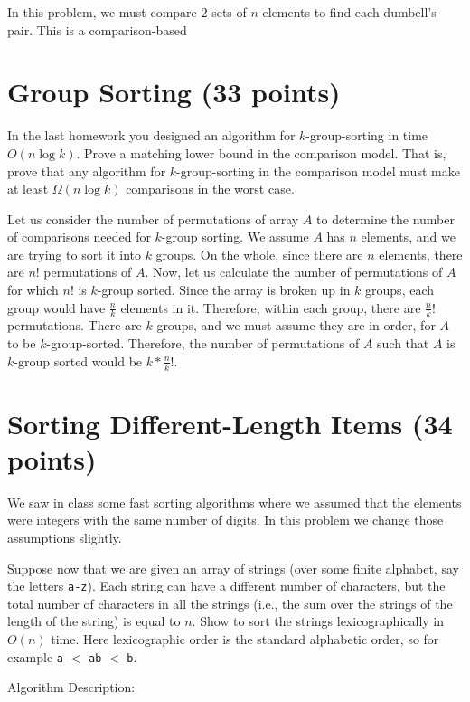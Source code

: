 \documentclass[11pt]{article}
\begin{document}
\bigbreak

In this problem, we must compare $2$ sets of $n$ elements to find each dumbell's pair. 
This is a comparison-based 

\section{Group Sorting (33 points)}
In the last homework you designed an algorithm for $k$-group-sorting in time $O(n \log k)$. 
Prove a matching lower bound in the comparison model. 
That is, prove that any algorithm for $k$-group-sorting in the comparison model must make at least $\Omega(n \log k)$ comparisons in the worst case.

\bigbreak

Let us consider the number of permutations of array $A$ to determine the number of comparisons needed for $k$-group sorting. 
We assume $A$ has $n$ elements, and we are trying to sort it into $k$ groups. 
On the whole, since there are $n$ elements, there are $n!$ permutations of $A$. 
Now, let us calculate the number of permutations of $A$ for which $n!$ is $k$-group sorted. 
Since the array is broken up in $k$ groups, each group would have $\frac{n}{k}$ elements in it. 
Therefore, within each group, there are $\frac{n}{k}!$ permutations. 
There are $k$ groups, and we must assume they are in order, for $A$ to be $k$-group-sorted. 
Therefore, the number of permutations of $A$ such that $A$ is $k$-group sorted would be $k * \frac{n}{k}!$.


\section{Sorting Different-Length Items (34 points)}
We saw in class some fast sorting algorithms where we assumed that the elements were integers with the same number of digits. 
In this problem we change those assumptions slightly.

Suppose now that we are given an array of strings (over some finite alphabet, say the letters {\tt a-z}). 
Each string can have a different number of characters, but the total number of characters in all the strings 
(i.e., the sum over the strings of the length of the string) is equal to $n$. 
Show to sort the strings lexicographically in $O(n)$ time.  Here lexicographic order is the standard alphabetic order, 
so for example {\tt a} $<$ {\tt ab} $<$ {\tt b}.

\bigbreak

Algorithm Description:
\end{document}
